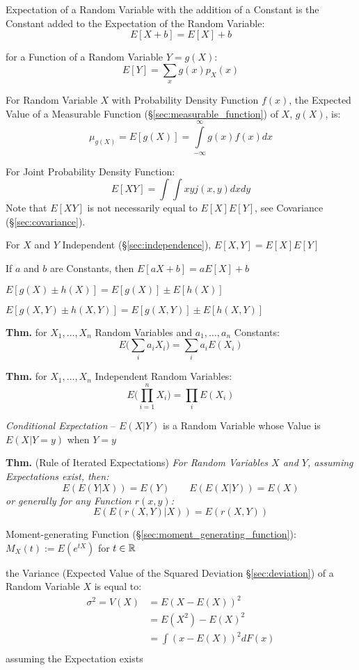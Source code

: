 Expectation of a Random Variable with the addition of a Constant is the
Constant added to the Expectation of the Random Variable:
\[
  E[X + b] = E[X] + b
\]

for a Function of a Random Variable $Y = g(X)$:
\[
  E[Y] = \sum_x g(x) p_X(x)
\]

For Random Variable $X$ with Probability Density Function $f(x)$, the
Expected Value of a Measurable Function
(\S\ref{sec:measurable_function}) of $X$, $g(X)$, is:
\[
  \mu_{g(X)} = E[g(X)] = \int\limits_{-\infty}^{\infty} g(x) f(x) dx
\]

For Joint Probability Density Function:
\[
  E[X Y] = \int\int x y j(x,y) dx dy
\]
\fist Note that $E[X Y]$ is not necessarily equal to $E[X] E[Y]$, see Covariance
(\S\ref{sec:covariance}).

For $X$ and $Y$ Independent (\S\ref{sec:independence}), $E[X,Y] = E[X] E[Y]$

If $a$ and $b$ are Constants, then $E[aX + b] = a E[X] + b$

$E [g(X) \pm h(X)] = E[g(X)] \pm E[h(X)]$

$E [g(X,Y) \pm h(X,Y)] = E[g(X,Y)] \pm E[h(X,Y)]$

\textbf{Thm.} for $X_1, \ldots, X_n$ Random Variables and $a_1, \ldots, a_n$
Constants:
\[
  E\Big(\sum_i a_i X_i\Big) = \sum_i a_i E(X_i)
\]

\textbf{Thm.} for $X_1, \ldots, X_n$ Independent Random Variables:
\[
  E\Big(\prod_{i=1}^n X_i\Big) = \prod_i E(X_i)
\]

\emph{Conditional Expectation} -- $E(X|Y)$ is a Random Variable whose Value is
$E(X|Y = y)$ when $Y = y$

\textbf{Thm.} (Rule of Iterated Expectations) \emph{
  For Random Variables $X$ and $Y$, assuming Expectations exist, then:
  \[
    E(E(Y|X)) = E(Y) \quad\quad E(E(X|Y)) = E(X)
  \]
  or generally for any Function $r(x,y)$:
  \[
    E(E(r(X,Y)|X)) = E(r(X,Y))
  \]
}

Moment-generating Function (\S\ref{sec:moment_generating_function}):
$M_X(t) := E(e^{tX})$ for $t \in \mathbb{R}$

the Variance (Expected Value of the Squared Deviation \S\ref{sec:deviation}) of
a Random Variable $X$ is equal to:
\begin{align*}
  \sigma^2 = V(X) & = E(X - E(X))^2   \\
                  & = E(X^2) - E(X)^2 \\
                  & = \int(x - E(X))^2 dF(x) \\
\end{align*}
assuming the Expectation exists

